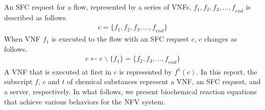 \documentclass[technicalreport]{ieicej}
\begin{document}

	An SFC request for a flow, represented by a series of VNFs, $f_1, f_2, f_3, ..., \mathit{f_{end}}$ is described as follows.
	\begin{eqnarray*}
		c = \{f_1, f_2, f_3, ..., \mathit{f_{end}}\}
	\end{eqnarray*}
	When VNF $f_1$ is executed to the flow with an SFC request $c$, $c$ changes as follows.
	\begin{eqnarray*}
		c\xleftarrow[]{}c\backslash\{f_1\} = \{f_2, f_3, ..., \mathit{f_{end}}\}
	\end{eqnarray*}
	A VNF that is executed at first in $c$ is represented by $f^1(c)$.
	In this report, the subscript $f$, $c$ and $t$ of chemical substances represent a VNF, an SFC request, and a server, respectively.
	In what follows, we present biochemical reaction equations that achieve various behaviors for the NFV system.
\end{document}
